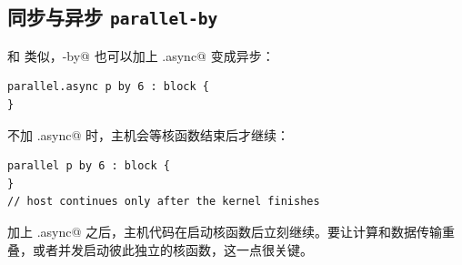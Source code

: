 \subsection*{同步与异步 \texttt{parallel-by}}

和 \co@inthreads@ 类似，\co@parallel-by@ 也可以加上 \co@.async@ 变成异步：

\begin{lstlisting}[language=croqtile,caption={一次异步启动}]
parallel.async p by 6 : block {
}
\end{lstlisting}

不加 \co@.async@ 时，主机会等核函数结束后才继续：

\begin{lstlisting}[language=croqtile,caption={同步形式}]
parallel p by 6 : block {
}
// host continues only after the kernel finishes
\end{lstlisting}

加上 \co@.async@ 之后，主机代码在启动核函数后立刻继续。要让计算和数据传输重叠，或者并发启动彼此独立的核函数，这一点很关键。
